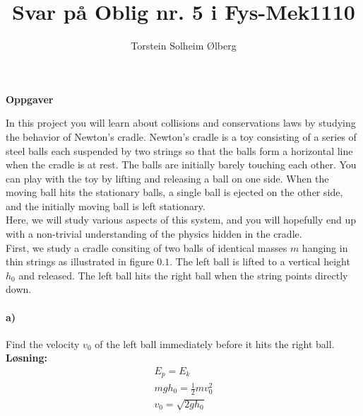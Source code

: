 \documentclass[11pt, A4paper,norsk]{article}
\author{Torstein Solheim Ølberg}
\title{Svar på Oblig nr. 5 i Fys-Mek1110}
\begin{document}
\maketitle
	\begin{center}
\Large \textbf{Oppgaver}
	\end{center}
In this project you will learn about collisions and conservations laws by studying the behavior of Newton’s cradle. Newton’s cradle is a toy consisting of a series of steel balls each suspended by two strings so that the balls form a horizontal line when the cradle is at rest. The balls are initially barely touching each other. You can play with the toy by lifting and releasing a ball on one side. When the moving ball hits the stationary balls, a single ball is ejected on the other side, and the initially moving ball is left stationary. \\
Here, we will study various aspects of this system, and you will hopefully end up with a non-trivial understanding of the physics hidden in the cradle. \\
First, we study a cradle consiting of two balls of identical masses $m$ hanging in thin strings as illustrated in figure $0.1$. The left ball is lifted to a vertical height $h_0$ and released. The left ball hits the right ball when the string points directly down.














		\paragraph{a)}
			\begin{flushleft}
Find the velocity $v_0$ of the left ball immediately before it hits the right ball. \\
\vspace{1mm}
\textbf{Løsning:}
\vspace{1mm}
				\begin{align}
E_p = E_k \nonumber \\
mgh_0 = \frac{1}{2}mv_0^2 \nonumber \\
v_0 = \sqrt{2gh_0} \nonumber
				\end{align}
			\end{flushleft}
\end{document}
